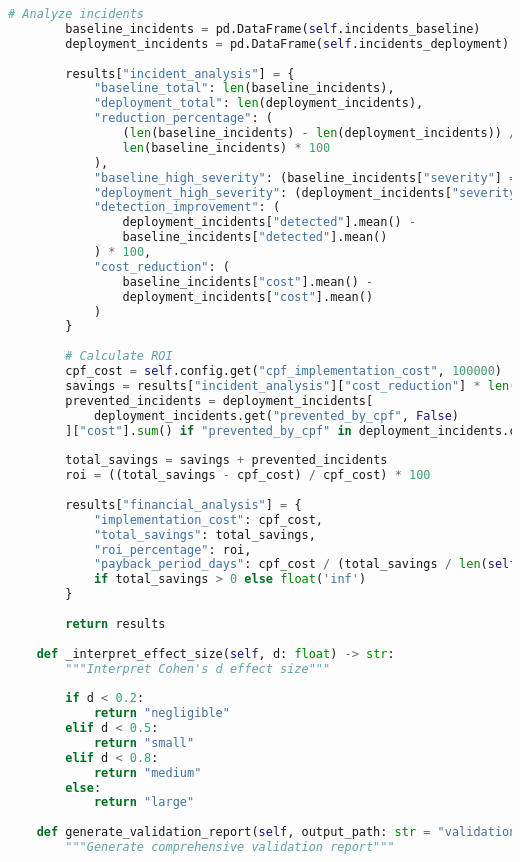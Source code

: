 \documentclass[11pt,a4paper]{article}
\begin{document}
\begin{lstlisting}[language=Python, caption=CPF Validation Framework]
        # Analyze incidents
        baseline_incidents = pd.DataFrame(self.incidents_baseline)
        deployment_incidents = pd.DataFrame(self.incidents_deployment)
        
        results["incident_analysis"] = {
            "baseline_total": len(baseline_incidents),
            "deployment_total": len(deployment_incidents),
            "reduction_percentage": (
                (len(baseline_incidents) - len(deployment_incidents)) / 
                len(baseline_incidents) * 100
            ),
            "baseline_high_severity": (baseline_incidents["severity"] == "high").sum(),
            "deployment_high_severity": (deployment_incidents["severity"] == "high").sum(),
            "detection_improvement": (
                deployment_incidents["detected"].mean() - 
                baseline_incidents["detected"].mean()
            ) * 100,
            "cost_reduction": (
                baseline_incidents["cost"].mean() - 
                deployment_incidents["cost"].mean()
            )
        }
        
        # Calculate ROI
        cpf_cost = self.config.get("cpf_implementation_cost", 100000)
        savings = results["incident_analysis"]["cost_reduction"] * len(deployment_incidents)
        prevented_incidents = deployment_incidents[
            deployment_incidents.get("prevented_by_cpf", False)
        ]["cost"].sum() if "prevented_by_cpf" in deployment_incidents.columns else 0
        
        total_savings = savings + prevented_incidents
        roi = ((total_savings - cpf_cost) / cpf_cost) * 100
        
        results["financial_analysis"] = {
            "implementation_cost": cpf_cost,
            "total_savings": total_savings,
            "roi_percentage": roi,
            "payback_period_days": cpf_cost / (total_savings / len(self.deployment_metrics))
            if total_savings > 0 else float('inf')
        }
        
        return results
    
    def _interpret_effect_size(self, d: float) -> str:
        """Interpret Cohen's d effect size"""
        
        if d < 0.2:
            return "negligible"
        elif d < 0.5:
            return "small"
        elif d < 0.8:
            return "medium"
        else:
            return "large"
    
    def generate_validation_report(self, output_path: str = "validation_report.json") -> Dict:
        """Generate comprehensive validation report"""
        

\end{lstlisting}
\end{document}
